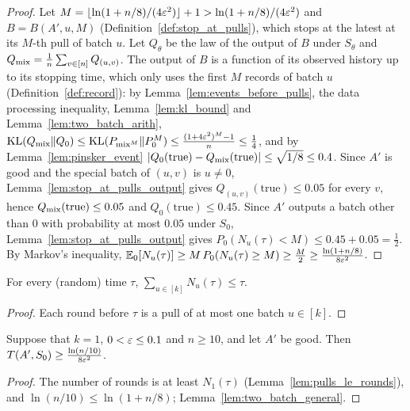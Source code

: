 \begin{proof}
  \leanok
  Let $M = \lfloor \ln(1 + n/8)/(4\varepsilon^2) \rfloor + 1 > \ln(1 + n/8)/(4\varepsilon^2)$ and
  $B = B(A', u, M)$ (Definition~\ref{def:stop_at_pulls}), which stops at the latest at its $M$-th
  pull of batch $u$. Let $Q_\theta$ be the law of the output of $B$ under $S_\theta$ and
  $Q_{\mathrm{mix}} = \frac1n \sum_{v \in [n]} Q_{(u, v)}$. The output of $B$ is a function of its observed
  history up to its stopping time, which only uses the first $M$ records of batch $u$
  (Definition~\ref{def:record}): by Lemma~\ref{lem:events_before_pulls}, the data processing
  inequality, Lemma~\ref{lem:kl_bound} and Lemma~\ref{lem:two_batch_arith},
  $\mathrm{KL}(Q_{\mathrm{mix}} \| Q_0) \le \mathrm{KL}(P_{\mathrm{mix}^M} \| P_0^M) \le \frac{(1 + 4\varepsilon^2)^M - 1}{n} \le \frac14$,
  and by Lemma~\ref{lem:pinsker_event}
  $\lvert Q_0(\mathrm{true}) - Q_{\mathrm{mix}}(\mathrm{true}) \rvert \le \sqrt{1/8} \le 0.4$. Since $A'$ is good and
  the special batch of $(u, v)$ is $u \ne 0$, Lemma~\ref{lem:stop_at_pulls_output} gives
  $Q_{(u, v)}(\mathrm{true}) \le 0.05$ for every $v$, hence $Q_{\mathrm{mix}}(\mathrm{true}) \le 0.05$ and
  $Q_0(\mathrm{true}) \le 0.45$. Since $A'$ outputs a batch other than $0$ with probability at most
  $0.05$ under $S_0$, Lemma~\ref{lem:stop_at_pulls_output} gives
  $P_0(N_u(\tau) < M) \le 0.45 + 0.05 = \frac12$. By Markov's inequality,
  $\mathbb{E}_0[N_u(\tau)] \ge M\, P_0(N_u(\tau) \ge M) \ge \frac M2 \ge \frac{\ln(1 + n/8)}{8\varepsilon^2}$.
\end{proof}

\begin{lemma}
  \label{lem:pulls_le_rounds}
  \leanok
  For every (random) time $\tau$, $\sum_{u \in [k]} N_u(\tau) \le \tau$.
\end{lemma}

\begin{proof}
  \leanok
  Each round before $\tau$ is a pull of at most one batch $u \in [k]$.
\end{proof}

\begin{lemma}
  \label{lem:two_batch}
  \leanok
  Suppose that $k = 1$, $0 < \varepsilon \le 0.1$ and $n \ge 10$, and let $A'$ be good. Then
  $T(A', S_0) \ge \frac{\ln(n/10)}{8\varepsilon^2}$.
\end{lemma}

\begin{proof}
  \leanok
  The number of rounds is at least $N_1(\tau)$ (Lemma~\ref{lem:pulls_le_rounds}), and
  $\ln(n/10) \le \ln(1 + n/8)$; Lemma~\ref{lem:two_batch_general}.
\end{proof}

